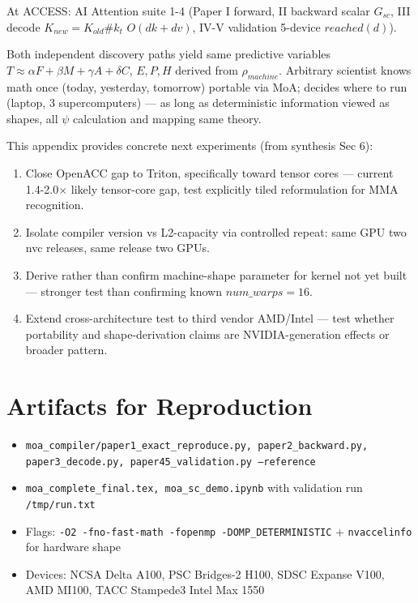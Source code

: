 \documentclass[11pt]{article}
\begin{document}
At ACCESS: AI Attention suite 1-4 (Paper I forward, II backward scalar $G_{sc}$, III decode $K_{new}=K_{old}\#k_t$ $O(dk+dv)$, IV-V validation 5-device $reached(d)$).

Both independent discovery paths yield same predictive variables $T\approx\alpha F+\beta M+\gamma A+\delta C$, $E,P,H$ derived from $\rho_{machine}$. Arbitrary scientist knows math once (today, yesterday, tomorrow) portable via MoA; decides where to run (laptop, 3 supercomputers) — as long as deterministic information viewed as shapes, all $\psi$ calculation and mapping same theory.

This appendix provides concrete next experiments (from synthesis Sec 6):
\begin{enumerate}
\item Close OpenACC gap to Triton, specifically toward tensor cores — current 1.4-2.0$\times$ likely tensor-core gap, test explicitly tiled reformulation for MMA recognition.
\item Isolate compiler version vs L2-capacity via controlled repeat: same GPU two nvc releases, same release two GPUs.
\item Derive rather than confirm machine-shape parameter for kernel not yet built — stronger test than confirming known $num\_warps=16$.
\item Extend cross-architecture test to third vendor AMD/Intel — test whether portability and shape-derivation claims are NVIDIA-generation effects or broader pattern.
\end{enumerate}

\section{Artifacts for Reproduction}
\begin{itemize}
\item \texttt{moa\_compiler/paper1\_exact\_reproduce.py, paper2\_backward.py, paper3\_decode.py, paper45\_validation.py --reference}
\item \texttt{moa\_complete\_final.tex, moa\_sc\_demo.ipynb} with validation run \texttt{/tmp/run.txt}
\item Flags: \texttt{-O2 -fno-fast-math -fopenmp -DOMP\_DETERMINISTIC} + \texttt{nvaccelinfo} for hardware shape
\item Devices: NCSA Delta A100, PSC Bridges-2 H100, SDSC Expanse V100, AMD MI100, TACC Stampede3 Intel Max 1550
\end{itemize}
\end{document}
